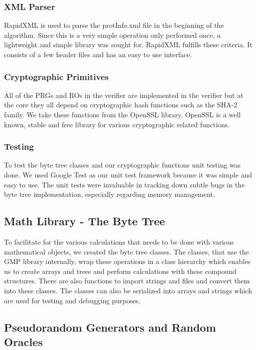 \subsubsection{XML Parser}

RapidXML is used to parse the protInfo.xml file in the beginning of
the algorithm. Since this is a very simple operation only performed
once, a lightweight and simple library was sought for. RapidXML
fulfills these criteria. It consists of a few header files and has an
easy to use interface.

\subsubsection{Cryptographic Primitives}

All of the PRGs and ROs in the verifier are implemented in the
verifier but at the core they all depend on cryptographic hash
functions such as the SHA-2 family. We take these functions from the
OpenSSL library. OpenSSL is a well known, stable and free library for
various cryptographic related functions.

\subsubsection{Testing}

To test the byte tree classes and our cryptographic functions unit
testing was done. We used Google Test as our unit test framework
because it was simple and easy to use. The unit tests were invaluable
in tracking down subtle bugs in the byte tree implementation,
especially regarding memory management.

\subsection{Math Library - The Byte Tree}

To facilitate for the various calculations that needs to be done with
various mathematical objects, we created the byte tree classes. The
classes, that use the GMP library internally, wrap these operations
in a class hierarchy which enables us to create arrays and trees and
perform calculations with these compound structures. There are also
functions to import strings and files and convert them into these
classes. The classes can also be serialized into arrays and strings
which are used for testing and debugging purposes.

\subsection{Pseudorandom Generators and Random Oracles}

